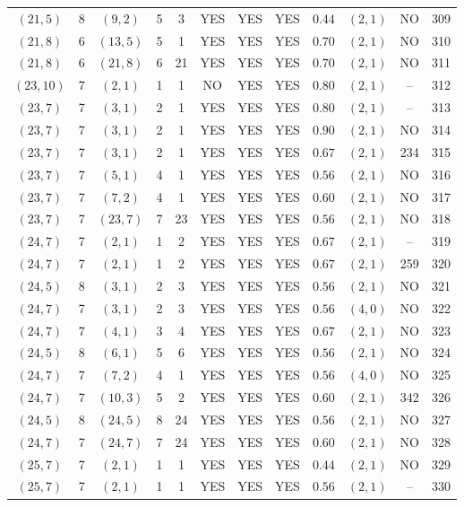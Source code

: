 \begin{longtable}{|c|c|c|c|c|c|c|c|c|c|c|c|}
$(21,5)$ & 8 & $(9,2)$ & 5 & 3 & YES & YES & YES & $0.44$ & $(2,1)$ & NO & 309\\
$(21,8)$ & 6 & $(13,5)$ & 5 & 1 & YES & YES & YES & $0.70$ & $(2,1)$ & NO & 310\\
$(21,8)$ & 6 & $(21,8)$ & 6 & 21 & YES & YES & YES & $0.70$ & $(2,1)$ & NO & 311\\
$(23,10)$ & 7 & $(2,1)$ & 1 & 1 & NO & YES & YES & $0.80$ & $(2,1)$ & -- & 312\\
$(23,7)$ & 7 & $(3,1)$ & 2 & 1 & YES & YES & YES & $0.80$ & $(2,1)$ & -- & 313\\
$(23,7)$ & 7 & $(3,1)$ & 2 & 1 & YES & YES & YES & $0.90$ & $(2,1)$ & NO & 314\\
$(23,7)$ & 7 & $(3,1)$ & 2 & 1 & YES & YES & YES & $0.67$ & $(2,1)$ & 234 & 315\\
$(23,7)$ & 7 & $(5,1)$ & 4 & 1 & YES & YES & YES & $0.56$ & $(2,1)$ & NO & 316\\
$(23,7)$ & 7 & $(7,2)$ & 4 & 1 & YES & YES & YES & $0.60$ & $(2,1)$ & NO & 317\\
$(23,7)$ & 7 & $(23,7)$ & 7 & 23 & YES & YES & YES & $0.56$ & $(2,1)$ & NO & 318\\
$(24,7)$ & 7 & $(2,1)$ & 1 & 2 & YES & YES & YES & $0.67$ & $(2,1)$ & -- & 319\\
$(24,7)$ & 7 & $(2,1)$ & 1 & 2 & YES & YES & YES & $0.67$ & $(2,1)$ & 259 & 320\\
$(24,5)$ & 8 & $(3,1)$ & 2 & 3 & YES & YES & YES & $0.56$ & $(2,1)$ & NO & 321\\
$(24,7)$ & 7 & $(3,1)$ & 2 & 3 & YES & YES & YES & $0.56$ & $(4,0)$ & NO & 322\\
$(24,7)$ & 7 & $(4,1)$ & 3 & 4 & YES & YES & YES & $0.67$ & $(2,1)$ & NO & 323\\
$(24,5)$ & 8 & $(6,1)$ & 5 & 6 & YES & YES & YES & $0.56$ & $(2,1)$ & NO & 324\\
$(24,7)$ & 7 & $(7,2)$ & 4 & 1 & YES & YES & YES & $0.56$ & $(4,0)$ & NO & 325\\
$(24,7)$ & 7 & $(10,3)$ & 5 & 2 & YES & YES & YES & $0.60$ & $(2,1)$ & 342 & 326\\
$(24,5)$ & 8 & $(24,5)$ & 8 & 24 & YES & YES & YES & $0.56$ & $(2,1)$ & NO & 327\\
$(24,7)$ & 7 & $(24,7)$ & 7 & 24 & YES & YES & YES & $0.60$ & $(2,1)$ & NO & 328\\
$(25,7)$ & 7 & $(2,1)$ & 1 & 1 & YES & YES & YES & $0.44$ & $(2,1)$ & NO & 329\\
$(25,7)$ & 7 & $(2,1)$ & 1 & 1 & YES & YES & YES & $0.56$ & $(2,1)$ & -- & 330\\

\end{longtable}
